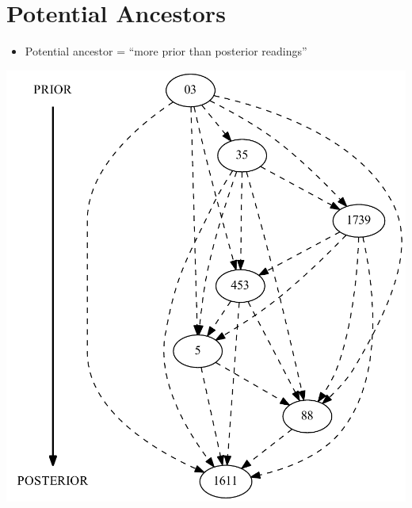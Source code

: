 \documentclass[10pt]{beamer}
\begin{document}
	\section*{Potential Ancestors}
	\begin{frame}
		\begin{itemize}
			\item Potential ancestor = ``more prior than posterior readings''
		\end{itemize}
		\begin{center}
			\includegraphics[scale=0.4]{../img/potential-ancestors.pdf}
		\end{center}
	\end{frame}
\end{document}
